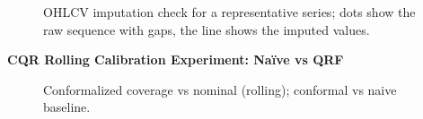 \documentclass[
  a4paper,
  DIV=11,
  numbers=noendperiod]{scrreprt}
\begin{document}
\begin{figure}


\caption{\label{fig-eda-imputation-check}OHLCV imputation check for a
representative series; dots show the raw sequence with gaps, the line
shows the imputed values.}

\end{figure}%

\textbf{CQR Rolling Calibration Experiment: Naïve vs QRF}

\begin{figure}


\caption{\label{fig-cqr-calibration}Conformalized coverage vs nominal
(rolling); conformal vs naive baseline.}

\end{figure}%
\end{document}
